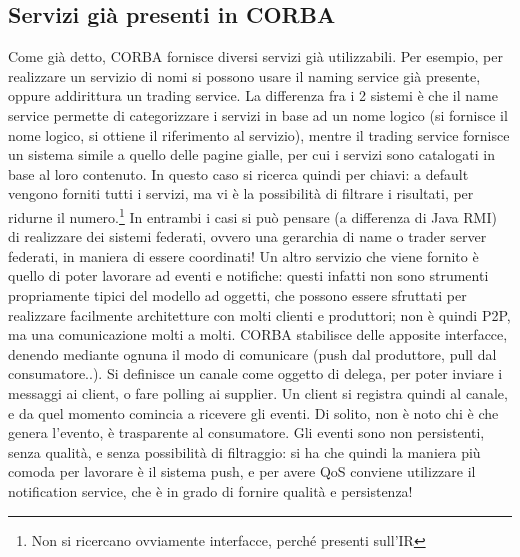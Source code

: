 \subsection{Servizi già presenti in CORBA}
Come già detto, CORBA fornisce diversi servizi già utilizzabili.
Per esempio, per realizzare un servizio di nomi si possono usare il naming service già presente, oppure addirittura un 
trading service. La differenza fra i 2 sistemi è che il name service permette di categorizzare i servizi in base ad
un nome logico (si fornisce il nome logico, si ottiene il riferimento al servizio), mentre il trading service fornisce 
un sistema simile a quello delle pagine gialle, per cui i servizi sono catalogati in base al loro contenuto. In questo 
caso si ricerca quindi per chiavi: a default vengono forniti tutti i servizi, ma vi è la possibilità di filtrare i 
risultati, per ridurne il numero.\footnote{Non si ricercano ovviamente interfacce, perché presenti sull'IR}
In entrambi i casi si può pensare (a differenza di Java RMI) di realizzare dei sistemi federati, ovvero una gerarchia di 
name o trader server federati, in maniera di essere coordinati!
Un altro servizio che viene fornito è quello di poter lavorare ad eventi e notifiche: questi infatti non sono strumenti 
propriamente tipici del modello ad oggetti, che possono essere sfruttati per realizzare facilmente architetture con
molti clienti e produttori; non è quindi P2P, ma una comunicazione molti a molti.
CORBA stabilisce delle apposite interfacce, denendo mediante ognuna il modo di comunicare (push dal produttore, pull dal 
consumatore..). Si definisce un canale come oggetto di delega, per poter inviare i messaggi ai client, o fare polling ai 
supplier. Un client si registra quindi al canale, e da quel momento comincia a ricevere gli eventi.
Di solito, non è noto chi è che genera l'evento, è trasparente al consumatore.
Gli eventi sono non persistenti, senza qualità, e senza possibilità di filtraggio: si ha che quindi la maniera più 
comoda per lavorare è il sistema push, e per avere QoS conviene utilizzare il notification service, che è in grado di 
fornire qualità e persistenza!